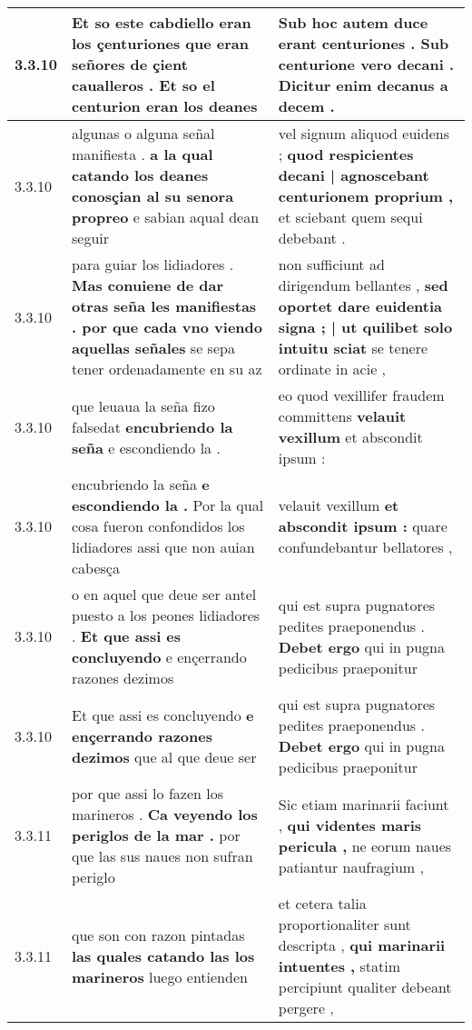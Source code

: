 \begin{tabular}{|p{1cm}|p{6.5cm}|p{6.5cm}|}
3.3.10 & Et so este cabdiello eran los çenturiones \textbf{ que eran señores de çient caualleros . } Et so el centurion eran los deanes & Sub hoc autem duce erant centuriones . \textbf{ Sub centurione vero decani . } Dicitur enim decanus a decem . \\\hline
3.3.10 & algunas o alguna señal manifiesta . \textbf{ a la qual catando los deanes conosçian al su senora propreo } e sabian aqual dean seguir & vel signum aliquod euidens ; \textbf{ quod respicientes decani | agnoscebant centurionem proprium , } et sciebant quem sequi debebant . \\\hline
3.3.10 & para guiar los lidiadores . \textbf{ Mas conuiene de dar otras seña les manifiestas . por que cada vno viendo aquellas señales } se sepa tener ordenadamente en su az & non sufficiunt ad dirigendum bellantes , \textbf{ sed oportet dare euidentia signa ; | ut quilibet solo intuitu sciat } se tenere ordinate in acie , \\\hline
3.3.10 & que leuaua la seña fizo falsedat \textbf{ encubriendo la seña } e escondiendo la . & eo quod vexillifer fraudem committens \textbf{ velauit vexillum } et abscondit ipsum : \\\hline
3.3.10 & encubriendo la seña \textbf{ e escondiendo la . } Por la qual cosa fueron confondidos los lidiadores assi que non auian cabesça & velauit vexillum \textbf{ et abscondit ipsum : } quare confundebantur bellatores , \\\hline
3.3.10 & o en aquel que deue ser antel puesto a los peones lidiadores . \textbf{ Et que assi es concluyendo } e ençerrando razones dezimos & qui est supra pugnatores pedites praeponendus . \textbf{ Debet ergo } qui in pugna pedicibus praeponitur \\\hline
3.3.10 & Et que assi es concluyendo \textbf{ e ençerrando razones dezimos } que al que deue ser & qui est supra pugnatores pedites praeponendus . \textbf{ Debet ergo } qui in pugna pedicibus praeponitur \\\hline
3.3.11 & por que assi lo fazen los marineros . \textbf{ Ca veyendo los periglos de la mar . } por que las sus naues non sufran periglo & Sic etiam marinarii faciunt , \textbf{ qui videntes maris pericula , } ne eorum naues patiantur naufragium , \\\hline
3.3.11 & que son con razon pintadas \textbf{ las quales catando las los marineros } luego entienden & et cetera talia proportionaliter sunt descripta , \textbf{ qui marinarii intuentes , } statim percipiunt qualiter debeant pergere , \\\hline

\end{tabular}
